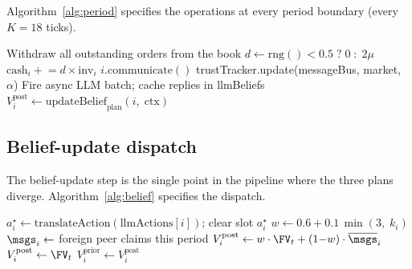 Algorithm~\ref{alg:period} specifies the operations at every period
boundary (every $K{=}18$ ticks).

\begin{algorithm}[h]
\caption{Period-boundary protocol}
\label{alg:period}
\begin{algorithmic}[1]
\State Withdraw all outstanding orders from the book
\State $d \gets \text{rng}() < 0.5\;?\;0\;:\;2\mu$
  \State $\text{cash}_i \mathrel{+}= d \times \text{inv}_i$
\EndFor
{}
    \State $i.\text{communicate}()$
  \EndFor
  \State trustTracker.update(messageBus, market, $\alpha$)
    \State Fire async LLM batch; cache replies in llmBeliefs
  \EndIf
    \State $V_i^{\text{post}} \gets
      \text{updateBelief}_{\text{plan}}(i,\;\text{ctx})$
  \EndFor
\EndIf
\end{algorithmic}
\end{algorithm}

\subsection{Belief-update dispatch}

The belief-update step is the single point in the pipeline where the
three plans diverge.  Algorithm~\ref{alg:belief} specifies the
dispatch.

\begin{algorithm}[h]
\caption{Decision dispatch for agent $i$}
\label{alg:belief}
\begin{algorithmic}[1]
  \State $a_i^\star \gets \text{translateAction}(\text{llmActions}[i])$;\;
    clear slot
    \State \Return $a_i^\star$
  \EndIf
\EndIf
\State {}
\State $w \gets 0.6 + 0.1\,\min(3,\;k_i)$
\State $\msgs_i \gets$ foreign peer claims this period
  \State $V_i^{\text{post}} \gets w \cdot \FV_t +
    (1{-}w)\cdot\overline{\msgs}_i$
\Else
  \State $V_i^{\text{post}} \gets \FV_t$
\EndIf
\State $V_i^{\text{prior}} \gets V_i^{\text{post}}$
\end{algorithmic}
\end{algorithm}

